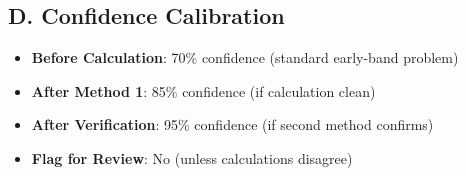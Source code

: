 \documentclass[11pt]{article}
\begin{document}
\begin{verificationbox}
\subsection*{D. Confidence Calibration}
\begin{itemize}[leftmargin=*]
    \item \textbf{Before Calculation}: 70\% confidence (standard early-band problem)
    \item \textbf{After Method 1}: 85\% confidence (if calculation clean)
    \item \textbf{After Verification}: 95\% confidence (if second method confirms)
    \item \textbf{Flag for Review}: No (unless calculations disagree)
\end{itemize}
\end{verificationbox}
\end{document}

